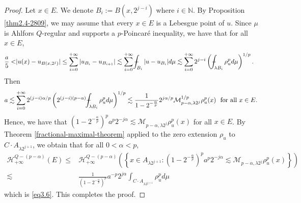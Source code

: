 \documentclass[10pt]{amsart}
\def\Xint#1{\mathchoice
	{\XXint\displaystyle\textstyle{#1}}
	{\XXint\textstyle\scriptstyle{#1}}
	{\XXint\scriptstyle\scriptscriptstyle{#1}}
	{\XXint\scriptscriptstyle\scriptscriptstyle{#1}}
	\!\int}
\def\XXint#1#2#3{{\setbox0=\hbox{$#1{#2#3}{\int}$ }
		\vcenter{\hbox{$#2#3$ }}\kern-.6\wd0}}
\def\dashint{\Xint-}
\numberwithin{equation}{section}
\begin{document}
\begin{proof}Let $x\in E$. We denote $B_i:=B(x, 2^{j-i})$ where $i\in\mathbb N$. 
By Proposition \ref{thm2.4-2809}, we may assume that  every $x\in E$ is a Lebesgue point of $u$. Since  $\mu$ is Ahlfors $Q$-regular and supports a $p$-Poincar\'e inequality, we have that for all $x\in E$,
		\begin{align}
		 \frac{a}{5}< &|u(x)-u_{B(x,2^j)}|\leq \sum_{i=0}^{+\infty} |u_{B_i}-u_{B_{i+1}}|
		\lesssim  \sum_{i=0}^{+\infty} \dashint_{B_{i}}|u-u_{B_i}|d\mu \lesssim \sum_{i=0}^{+\infty} 2^{j-i}\left (\dashint_{\lambda B_i}\rho_u^pd\mu \right )^{1/p}.
		\notag
		\end{align}
	Then
		\[
			a\lesssim \sum_{i=0}^{+\infty} 2^{(j-i)\alpha/p}\left(2^{(j-i)(p-\alpha)}\dashint_{\lambda B_i}\rho_u^pd\mu\right)^{1/p} \lesssim  \frac{1}{1-2^{-\frac{\alpha}{p}}} 2^{j\alpha/p} \mathcal M^{1/p}_{p-\alpha,\lambda 2^j}\rho_u^p(x) \text{\rm \ \ for all $x\in E$.
			}
		\] 
		Hence, we have that 
		  $(1-2^{-\frac{\alpha}{p}})^pa^p2^{-j\alpha}\lesssim \mathcal M_{p-\alpha,\lambda 2^j}\rho_u^p(x)$ for all $x\in E$. By Theorem \ref{fractional-maximal-theorem} applied to  the zero extension $\rho_u$ to $C\cdot A_{\lambda 2^{j+1}}$, 		we obtain that for all $0<\alpha<p$,
		\begin{align*}
		\mathcal H^{Q-(p-\alpha)}_{+\infty}(E)\leq & \mathcal H_{{+\infty}}^{Q-(p-\alpha)}(\left\{ x\in A_{\lambda 2^{j+1}}:  {(1-2^{-\frac{\alpha}{p}})^p}a^p2^{-j\alpha}  \lesssim  \mathcal M_{p-\alpha,\lambda 2^j}\rho_u^p(x)\right\}) \\ 
		\lesssim &  \frac{1}{(1-2^{-\frac{\alpha}{p}})^p}a^{-p} 2^{j\alpha} \int_{C\cdot A_{\lambda 2^{j+1}}}\rho_u^pd\mu
		\end{align*}
		which is \eqref{eq3.6}.
	  This completes the proof.
\end{proof}
\end{document}
